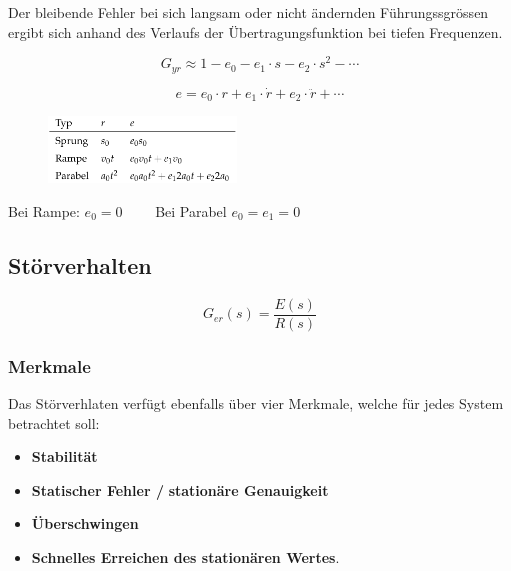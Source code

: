 \documentclass[
  10pt,
  a4paper,
  twocolumn]{article}
\providecommand{\tightlist}{%
  \setlength{\itemsep}{0pt}\setlength{\parskip}{0pt}}\usepackage{longtable,booktabs,array}
\numberwithin{equation}{section}
\begin{document}
Der bleibende Fehler bei sich langsam oder nicht ändernden
Führungssgrössen ergibt sich anhand des Verlaufs der
Übertragungsfunktion bei tiefen Frequenzen.

\[
G_{yr}\approx 1-e_0-e_1\cdot s-e_2\cdot s^2 - \cdots
\]

\[
e = e_0 \cdot r + e_1 \cdot \dot{r}+e_2\cdot \ddot{r}+\cdots
\]

\begin{figure}[H]

{\centering \includegraphics[width=5cm,height=1.8cm]{images/paste-37.png}

}

\end{figure}

\begin{tcolorbox}[enhanced jigsaw, opacitybacktitle=0.6, bottomrule=.15mm, left=2mm, colframe=quarto-callout-note-color-frame, titlerule=0mm, toprule=.15mm, bottomtitle=1mm, toptitle=1mm, coltitle=black, title=\textcolor{quarto-callout-note-color}{\faInfo}\hspace{0.5em}{Stationärer Fehler}, arc=.35mm, rightrule=.15mm, colback=white, opacityback=0, leftrule=.75mm, colbacktitle=quarto-callout-note-color!10!white, breakable]

Bei Rampe: \(e_0 = 0\qquad\) Bei Parabel \(e_0 = e_1 = 0\)

\end{tcolorbox}

\hypertarget{stuxf6rverhalten}{%
\subsection{Störverhalten}\label{stuxf6rverhalten}}

\[
G_{er}(s)=\frac{E(s)}{R(s)}
\]

\hypertarget{merkmale-1}{%
\subsubsection{Merkmale}\label{merkmale-1}}

Das Störverhlaten verfügt ebenfalls über vier Merkmale, welche für jedes
System betrachtet soll:

\begin{itemize}
\tightlist
\item
  \textbf{Stabilität}
\item
  \textbf{Statischer Fehler /} \textbf{stationäre Genauigkeit}
\item
  \textbf{Überschwingen}
\item
  \textbf{Schnelles Erreichen des stationären Wertes}.
\end{itemize}
\end{document}
